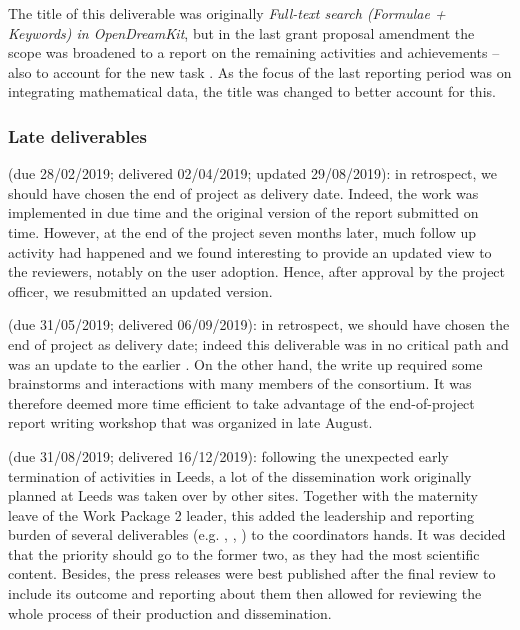 The title of this deliverable was originally \emph{Full-text search
  (Formulae + Keywords) in OpenDreamKit}, but in the last grant
proposal amendment the scope was broadened to a report on the
remaining  activities and achievements -- also to
account for the new task . As the focus of
the last reporting period was on integrating mathematical data, the title was changed to better account for this.

\subsubsection{Late deliverables}

 (due 28/02/2019;
delivered 02/04/2019; updated 29/08/2019): in retrospect, we should
have chosen the end of project as delivery date. Indeed, the work was
implemented in due time and the original version of the report
submitted on time. However, at the end of the project seven months
later, much follow up activity had happened and we found interesting
to provide an updated view to the reviewers, notably on the user
adoption. Hence, after approval by the project officer, we resubmitted
an updated version.

 (due 31/05/2019; delivered
06/09/2019): in retrospect, we should have chosen the end of project
as delivery date; indeed this deliverable was in no critical path and
was an update to the earlier . On the other
hand, the write up required some brainstorms and interactions with
many members of the consortium. It was therefore deemed more time
efficient to take advantage of the end-of-project report writing
workshop that was organized in late August.

 (due 31/08/2019; delivered
16/12/2019): following the unexpected early termination of activities
in Leeds, a lot of the dissemination work originally planned at Leeds
was taken over by other sites. Together with the maternity leave of
the Work Package 2 leader, this added the leadership and reporting
burden of several deliverables (e.g.
, ,
) to the coordinators hands. It
was decided that the priority should go to the former two, as they had
the most scientific content. Besides, the press releases were best
published after the final review to include its outcome and reporting
about them then allowed for reviewing the whole process of their
production and dissemination.

